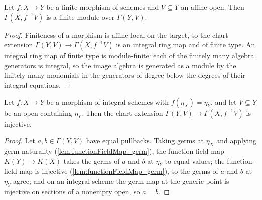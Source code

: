 \begin{lemma}
  \label{lem:moduleFinite_pullbackSections}
  \leanok
  Let \(f : X \to Y\) be a finite morphism of schemes and \(V \subseteq Y\) an affine
  open. Then \(\Gamma(X, f^{-1}V)\) is a finite module over \(\Gamma(Y, V)\).
\end{lemma}
\begin{proof}
  \leanok
  Finiteness of a morphism is affine-local on the target, so the chart extension
  \(\Gamma(Y, V) \to \Gamma(X, f^{-1}V)\) is an integral ring map and of finite type.
  An integral ring map of finite type is module-finite: each of the finitely many
  algebra generators is integral, so the image algebra is generated as a module by the
  finitely many monomials in the generators of degree below the degrees of their
  integral equations.
\end{proof}

\begin{lemma}
  \label{lem:faithfulSMul_pullbackSections}
  \leanok
  Let \(f : X \to Y\) be a morphism of integral schemes with \(f(\eta_X) = \eta_Y\),
  and let \(V \subseteq Y\) be an open containing \(\eta_Y\). Then the chart extension
  \(\Gamma(Y, V) \to \Gamma(X, f^{-1}V)\) is injective.
\end{lemma}
\begin{proof}
  \leanok
  Let \(a, b \in \Gamma(Y, V)\) have equal pullbacks. Taking germs at \(\eta_X\) and
  applying germ naturality (\ref{lem:functionFieldMap_germ}), the function-field map
  \(K(Y) \to K(X)\) takes the germs of \(a\) and \(b\) at \(\eta_Y\) to equal values;
  the function-field map is injective (\ref{lem:functionFieldMap_germ}), so the germs
  of \(a\) and \(b\) at \(\eta_Y\) agree; and on an integral scheme the germ map at the
  generic point is injective on sections of a nonempty open, so \(a = b\).
\end{proof}

